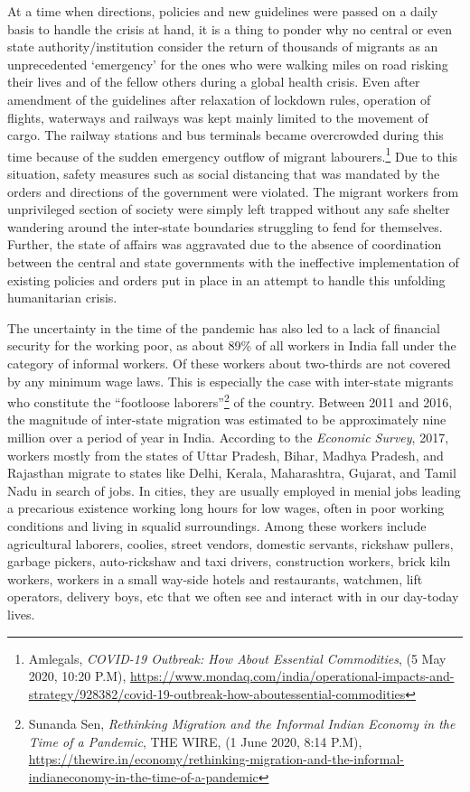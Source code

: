 \begin{multicols}{2}
\noi
At a time when directions, policies and new guidelines were passed on a daily basis to handle
the crisis at hand, it is a thing to ponder why no central or even state authority/institution
consider the return of thousands of migrants as an unprecedented ‘emergency’ for the ones
who were walking miles on road risking their lives and of the fellow others during a global
health crisis. Even after amendment of the guidelines after relaxation of lockdown rules,
operation of flights, waterways and railways was kept mainly limited to the movement of
cargo. The railway stations and bus terminals became overcrowded during this time because
of the sudden emergency outflow of migrant labourers.\footnote{Amlegals, \textit{COVID-19 Outbreak: How About Essential Commodities}, (5 May 2020, 10:20 P.M),
\url{https://www.mondaq.com/india/operational-impacts-and-strategy/928382/covid-19-outbreak-how-aboutessential-commodities}} Due to this situation, safety
measures such as social distancing that was mandated by the orders and directions of the
government were violated. The migrant workers from unprivileged section of society were
simply left trapped without any safe shelter wandering around the inter-state boundaries
struggling to fend for themselves. Further, the state of affairs was aggravated due to the
absence of coordination between the central and state governments with the ineffective
implementation of existing policies and orders put in place in an attempt to handle this
unfolding humanitarian crisis. 


\noi
The uncertainty in the time of the pandemic has also led to a lack of financial security for the
working poor, as about 89\% of all workers in India fall under the category of informal
workers. Of these workers about two-thirds are not covered by any minimum wage laws. This
is especially the case with inter-state migrants who constitute the “footloose laborers”\footnote{Sunanda Sen, \textit{Rethinking Migration and the Informal Indian Economy in the Time of a Pandemic}, THE
WIRE, (1 June 2020, 8:14 P.M), \url{https://thewire.in/economy/rethinking-migration-and-the-informal-indianeconomy-in-the-time-of-a-pandemic}} of the
country. Between 2011 and 2016, the magnitude of inter-state migration was estimated to be approximately nine million over a period of year in India. According to the \textit{Economic Survey},
2017, workers mostly from the states of Uttar Pradesh, Bihar, Madhya Pradesh, and
Rajasthan migrate to states like Delhi, Kerala, Maharashtra, Gujarat, and Tamil Nadu in
search of jobs. In cities, they are usually employed in menial jobs leading a precarious
existence working long hours for low wages, often in poor working conditions and living in
squalid surroundings. Among these workers include agricultural laborers, coolies, street
vendors, domestic servants, rickshaw pullers, garbage pickers, auto-rickshaw and taxi drivers,
construction workers, brick kiln workers, workers in a small way-side hotels and restaurants,
watchmen, lift operators, delivery boys, etc that we often see and interact with in our day-today lives.


\end{multicols}
